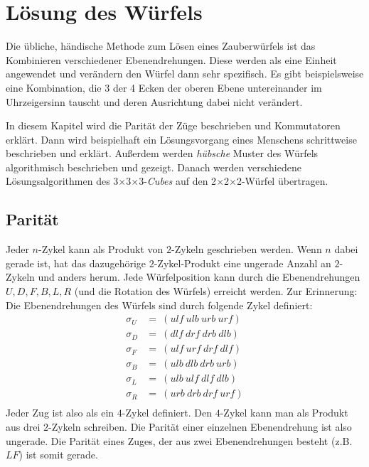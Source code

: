 \documentclass[12pt,a4paper, usenames, dvipsnames]{article}
\newcommand{\Ttwo}{2$\times$2$\times$2-}
\newcommand{\Tthree}{3$\times$3$\times$3-}
\begin{document}
\section{Lösung des Würfels}

Die übliche, händische Methode zum Lösen eines Zauberwürfels ist das Kombinieren verschiedener Ebenendrehungen. Diese werden als eine Einheit angewendet und verändern den Würfel dann sehr spezifisch. 
Es gibt beispielsweise eine Kombination, die 3 der 4 Ecken der oberen Ebene untereinander im Uhrzeigersinn tauscht und deren Ausrichtung dabei nicht verändert. 

In diesem Kapitel wird die Parität der Züge beschrieben und Kommutatoren erklärt.
Dann wird beispielhaft ein Lösungsvorgang eines Menschens schrittweise beschrieben und erklärt.
Außerdem werden \textit{hübsche} Muster des Würfels algorithmisch beschrieben und gezeigt.
Danach werden verschiedene Lösungsalgorithmen des \Tthree \textit{Cubes} auf den \Ttwo Würfel übertragen.

%
%
%
%
%
%
%
%
%
%
%
%
%
%
%
%
%
%
%
%
\subsection*{Parität}

Jeder $n$-Zykel kann als Produkt von $2$-Zykeln geschrieben werden. Wenn $n$ dabei gerade ist, hat das dazugehörige $2$-Zykel-Produkt eine ungerade Anzahl an $2$-Zykeln und anders herum. \cite{TD}
Jede Würfelposition kann durch die Ebenendrehungen $U, D, F, B, L, R$ (und die Rotation des Würfels) erreicht werden. 
Zur Erinnerung: Die Ebenendrehungen des Würfels sind durch folgende Zykel definiert:
\begin{align*}
\sigma_U & =\ (ulf \ ulb \ urb \ urf) \\
\sigma_D & =\ (dlf \ drf \ drb \ dlb) \\
\sigma_F & =\ (ulf \ urf \ drf \ dlf) \\
\sigma_B & =\ (ulb \ dlb \ drb \ urb) \\
\sigma_L & =\ (ulb \ ulf \ dlf \ dlb) \\
\sigma_R & =\ (urb \ drb \ drf \ urf) \\
\end{align*}
Jeder Zug ist also als ein $4$-Zykel definiert. Den $4$-Zykel kann man als Produkt aus drei $2$-Zykeln schreiben. 
Die Parität einer einzelnen Ebenendrehung ist also ungerade. Die Parität eines Zuges, der aus zwei Ebenendrehungen besteht (z.B. $LF$) ist somit gerade.
\end{document}
